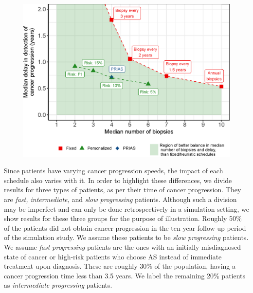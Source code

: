 \documentclass[a4paper, 12pt]{article}
\begin{document}
\begin{figure}[!htb]
\captionsetup{justification=justified}
\centerline{\includegraphics[width=\columnwidth]{Figure5.eps}}

\label{Figure5}
\end{figure}

Since patients have varying cancer progression speeds, the impact of each schedule also varies with it. In order to highlight these differences, we divide results for three types of patients, as per their time of cancer progression. They are \textit{fast, intermediate,} and \textit{slow progressing} patients. Although such a division may be imperfect and can only be done retrospectively in a simulation setting, we show results for these three groups for the purpose of illustration. Roughly 50\% of the patients did not obtain cancer progression in the ten year follow-up period of the simulation study. We assume these patients to be \textit{slow progressing} patients. We assume \textit{fast progressing} patients are the ones with an initially misdiagnosed state of cancer \citep{cooperberg2011outcomes} or high-risk patients who choose AS instead of immediate treatment upon diagnosis. These are roughly 30\% of the population, having a cancer progression time less than 3.5 years. We label the remaining 20\% patients as \textit{intermediate progressing} patients. 
\end{document}
